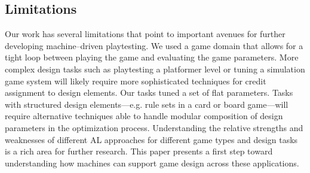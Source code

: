\documentclass{sig-alternate}
\begin{document}
\begin{table}[tbp]
%
\label{tab:cls_res}
\end{table}


\subsection{Limitations}

Our work has several limitations that point to important avenues for further developing machine--driven playtesting.
We used a game domain that allows for a tight loop between playing the game and evaluating the game parameters.
More complex design tasks such as playtesting a platformer level or tuning a simulation game system will likely require more sophisticated techniques for credit assignment to design elements.
Our tasks tuned a set of flat parameters.
Tasks with structured design elements---e.g. rule sets in a card or board game---will require alternative techniques able to handle modular composition of design parameters in the optimization process.
Understanding the relative strengths and weaknesses of different AL approaches for different game types and design tasks is a rich area for further research.
This paper presents a first step toward understanding how machines can support game design across these applications.
\end{document}

